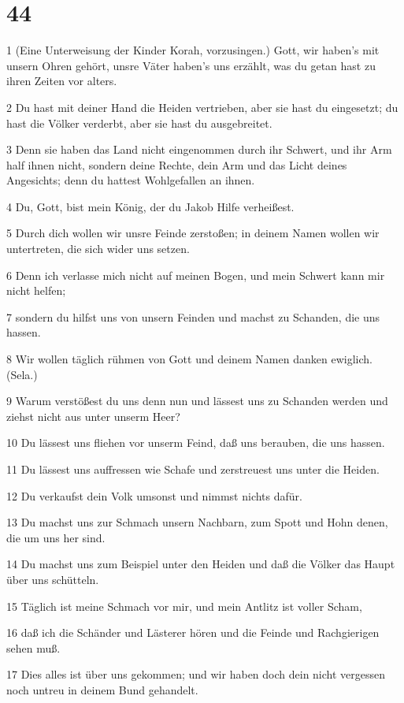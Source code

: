 \chapter{44}

\par 1 (Eine Unterweisung der Kinder Korah, vorzusingen.) Gott, wir haben's mit unsern Ohren gehört, unsre Väter haben's uns erzählt, was du getan hast zu ihren Zeiten vor alters.
\par 2 Du hast mit deiner Hand die Heiden vertrieben, aber sie hast du eingesetzt; du hast die Völker verderbt, aber sie hast du ausgebreitet.
\par 3 Denn sie haben das Land nicht eingenommen durch ihr Schwert, und ihr Arm half ihnen nicht, sondern deine Rechte, dein Arm und das Licht deines Angesichts; denn du hattest Wohlgefallen an ihnen.
\par 4 Du, Gott, bist mein König, der du Jakob Hilfe verheißest.
\par 5 Durch dich wollen wir unsre Feinde zerstoßen; in deinem Namen wollen wir untertreten, die sich wider uns setzen.
\par 6 Denn ich verlasse mich nicht auf meinen Bogen, und mein Schwert kann mir nicht helfen;
\par 7 sondern du hilfst uns von unsern Feinden und machst zu Schanden, die uns hassen.
\par 8 Wir wollen täglich rühmen von Gott und deinem Namen danken ewiglich. (Sela.)
\par 9 Warum verstößest du uns denn nun und lässest uns zu Schanden werden und ziehst nicht aus unter unserm Heer?
\par 10 Du lässest uns fliehen vor unserm Feind, daß uns berauben, die uns hassen.
\par 11 Du lässest uns auffressen wie Schafe und zerstreuest uns unter die Heiden.
\par 12 Du verkaufst dein Volk umsonst und nimmst nichts dafür.
\par 13 Du machst uns zur Schmach unsern Nachbarn, zum Spott und Hohn denen, die um uns her sind.
\par 14 Du machst uns zum Beispiel unter den Heiden und daß die Völker das Haupt über uns schütteln.
\par 15 Täglich ist meine Schmach vor mir, und mein Antlitz ist voller Scham,
\par 16 daß ich die Schänder und Lästerer hören und die Feinde und Rachgierigen sehen muß.
\par 17 Dies alles ist über uns gekommen; und wir haben doch dein nicht vergessen noch untreu in deinem Bund gehandelt.
